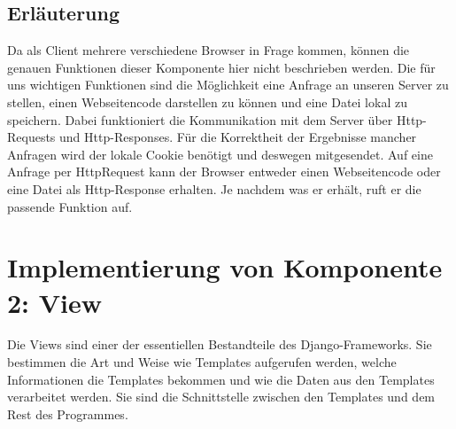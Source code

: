 \subsection{Erl\"auterung}

Da als Client mehrere verschiedene Browser in Frage kommen, können die genauen
Funktionen dieser Komponente hier nicht beschrieben werden. Die für uns
wichtigen Funktionen sind die Möglichkeit eine Anfrage an unseren Server zu
stellen, einen Webseitencode darstellen zu können und eine Datei lokal zu
speichern. Dabei funktioniert die Kommunikation mit dem Server über
Http-Requests und Http-Responses. Für die Korrektheit der Ergebnisse mancher
Anfragen wird der lokale Cookie benötigt und deswegen mitgesendet. 
Auf eine Anfrage per HttpRequest kann der Browser entweder einen Webseitencode 
oder eine Datei als Http-Response erhalten. Je nachdem was er erhält, ruft er 
die passende Funktion auf. 


\section{Implementierung von Komponente
         2: View}


Die Views sind einer der essentiellen Bestandteile des Django-Frameworks. Sie
bestimmen die Art und Weise wie Templates aufgerufen werden, welche
Informationen die Templates bekommen und wie die Daten aus den Templates
verarbeitet werden. Sie sind die Schnittstelle zwischen den Templates und dem
Rest des Programmes.
\newpage


